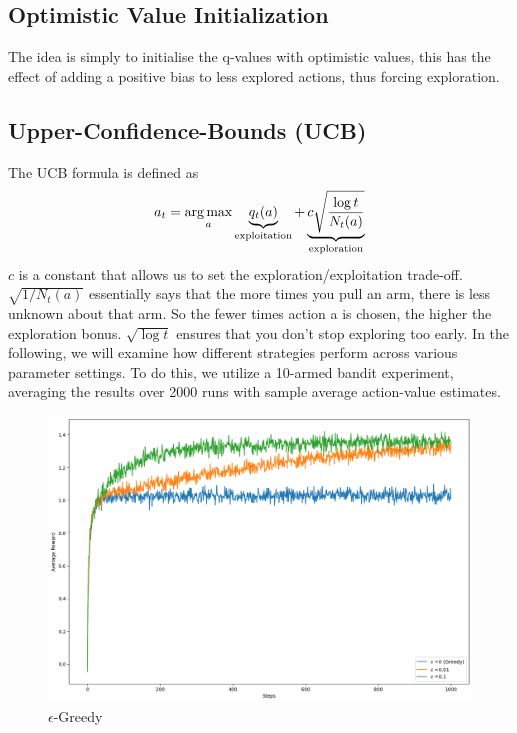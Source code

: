 \subsection{Optimistic Value Initialization}
The idea is simply to initialise the q-values with optimistic values, this has the effect of 
adding a positive bias to less explored actions, thus forcing exploration.

\subsection{Upper-Confidence-Bounds (UCB)}\label{UCB}
The UCB formula is defined as $$ a_t = \operatorname*{arg\,max}\limits_a 
\underbrace{q_t(a)}_{\text{exploitation}} + \underbrace{c \sqrt{\frac{\log{t}}
{N_t(a)}}}_{\text{exploration}}$$
$c$ is a constant that allows us to set the exploration/exploitation trade-off. 
$\sqrt{1/{N_t(a)}}$ essentially says that the more times you pull an arm, there is less unknown about that arm. 
So the fewer times action a is chosen, the higher the exploration bonus.
$\sqrt{\log{t}}$ ensures that you don't stop exploring too early. \newline 
In the following, we will examine how different strategies perform across various parameter settings. 
To do this, we utilize a 10-armed bandit experiment, averaging the results over 2000 runs with sample 
average action-value estimates.

\begin{figure}[H]
    \centering
    \includegraphics[width=\linewidth, height=0.33\textheight]{images/bandit_greedy.png}
    \caption{$\epsilon$-Greedy}
\end{figure}

